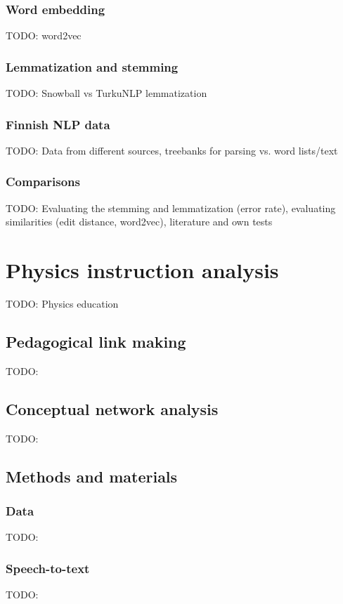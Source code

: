 \documentclass[utf8,english]{gradu3}
\begin{document}
\subsection{Word embedding}
TODO: word2vec

\subsection{Lemmatization and stemming}
TODO: Snowball vs TurkuNLP lemmatization

\subsection{Finnish NLP data}
TODO: Data from different sources, treebanks for parsing vs. word lists/text

\subsection{Comparisons}
TODO: Evaluating the stemming and lemmatization (error rate), evaluating similarities (edit distance, word2vec), literature and own tests

\chapter{Physics instruction analysis}
TODO: Physics education \parencite{wieman2005transforming, fischer2014quality}

\section{Pedagogical link making}
TODO: \parencite{scott2011pedagogical}
\section{Conceptual network analysis}
TODO: \parencite{mclinden2013concept,fischer2014quality, vargas}



\section{Methods and materials}
\subsection{Data}
  TODO: \parencite{fischer2014quality}
\subsection{Speech-to-text}
  TODO: \parencite{enarvi2018modeling}
\end{document}
